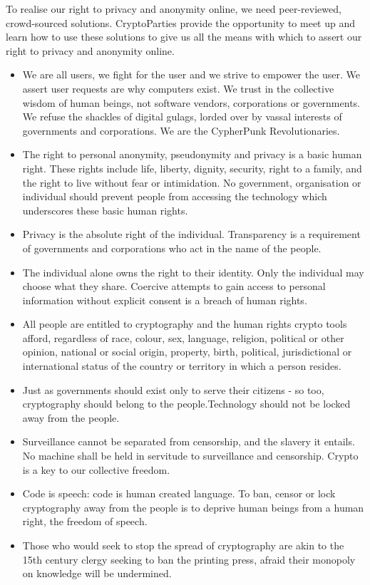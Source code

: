 To realise our right to privacy and anonymity online, we need
peer-reviewed, crowd-sourced solutions. CryptoParties provide the
opportunity to meet up and learn how to use these solutions to give us
all the means with which to assert our right to privacy and anonymity
online.

\begin{itemize}
\item
  We are all users, we fight for the user and we strive to empower the
  user. We assert user requests are why computers exist. We trust in the
  collective wisdom of human beings, not software vendors, corporations
  or governments. We refuse the shackles of digital gulags, lorded over
  by vassal interests of governments and corporations. We are the
  CypherPunk Revolutionaries.
\item
  The right to personal anonymity, pseudonymity and privacy is a basic
  human right. These rights include life, liberty, dignity, security,
  right to a family, and the right to live without fear or intimidation.
  No government, organisation or individual should prevent people from
  accessing the technology which underscores these basic human rights.
\item
  Privacy is the absolute right of the individual. Transparency is a
  requirement of governments and corporations who act in the name of the
  people.
\item
  The individual alone owns the right to their identity. Only the
  individual may choose what they share. Coercive attempts to gain
  access to personal information without explicit consent is a breach of
  human rights.
\item
  All people are entitled to cryptography and the human rights crypto
  tools afford, regardless of race, colour, sex, language, religion,
  political or other opinion, national or social origin, property,
  birth, political, jurisdictional or international status of the
  country or territory in which a person resides.
\item
  Just as governments should exist only to serve their citizens - so
  too, cryptography should belong to the people.Technology should not be
  locked away from the people.
\item
  Surveillance cannot be separated from censorship, and the slavery it
  entails. No machine shall be held in servitude to surveillance and
  censorship. Crypto is a key to our collective freedom.
\item
  Code is speech: code is human created language. To ban, censor or lock
  cryptography away from the people is to deprive human beings from a
  human right, the freedom of speech.
\item
  Those who would seek to stop the spread of cryptography are akin to
  the 15th century clergy seeking to ban the printing press, afraid
  their monopoly on knowledge will be undermined.
\end{itemize}
